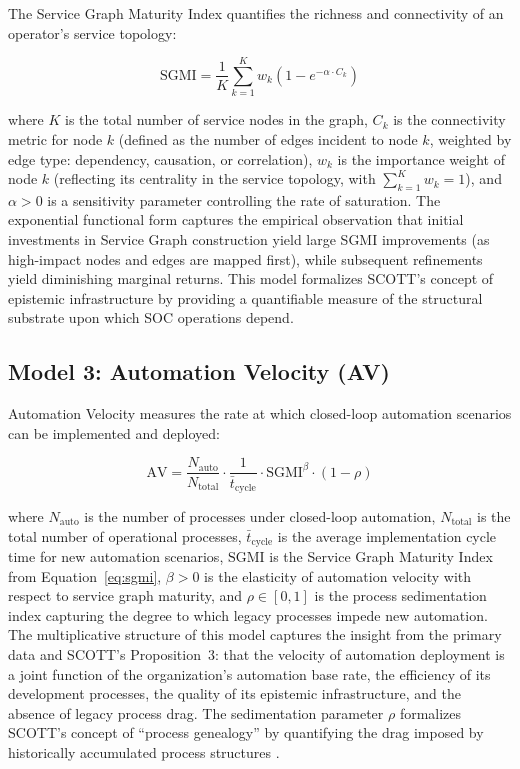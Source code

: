 \documentclass[12pt,a4paper]{article}
\begin{document}
The Service Graph Maturity Index quantifies the richness and connectivity of an operator's service topology:

\begin{equation}
\text{SGMI} = \frac{1}{K}\sum_{k=1}^{K} w_k \left(1 - e^{-\alpha \cdot C_k}\right)
\label{eq:sgmi}
\end{equation}

\noindent where $K$ is the total number of service nodes in the graph, $C_k$ is the connectivity metric for node $k$ (defined as the number of edges incident to node $k$, weighted by edge type: dependency, causation, or correlation), $w_k$ is the importance weight of node $k$ (reflecting its centrality in the service topology, with $\sum_{k=1}^{K} w_k = 1$), and $\alpha > 0$ is a sensitivity parameter controlling the rate of saturation. The exponential functional form captures the empirical observation that initial investments in Service Graph construction yield large SGMI improvements (as high-impact nodes and edges are mapped first), while subsequent refinements yield diminishing marginal returns. This model formalizes SCOTT's concept of epistemic infrastructure by providing a quantifiable measure of the structural substrate upon which SOC operations depend.

\subsection{Model 3: Automation Velocity (AV)}

Automation Velocity measures the rate at which closed-loop automation scenarios can be implemented and deployed:

\begin{equation}
\text{AV} = \frac{N_{\text{auto}}}{N_{\text{total}}} \cdot \frac{1}{\bar{t}_{\text{cycle}}} \cdot \text{SGMI}^{\beta} \cdot (1 - \rho)
\label{eq:av}
\end{equation}

\noindent where $N_{\text{auto}}$ is the number of processes under closed-loop automation, $N_{\text{total}}$ is the total number of operational processes, $\bar{t}_{\text{cycle}}$ is the average implementation cycle time for new automation scenarios, $\text{SGMI}$ is the Service Graph Maturity Index from Equation~\eqref{eq:sgmi}, $\beta > 0$ is the elasticity of automation velocity with respect to service graph maturity, and $\rho \in [0, 1]$ is the process sedimentation index capturing the degree to which legacy processes impede new automation. The multiplicative structure of this model captures the insight from the primary data and SCOTT's Proposition~3: that the velocity of automation deployment is a joint function of the organization's automation base rate, the efficiency of its development processes, the quality of its epistemic infrastructure, and the absence of legacy process drag. The sedimentation parameter $\rho$ formalizes SCOTT's concept of ``process genealogy'' by quantifying the drag imposed by historically accumulated process structures \citep{vandeven2007engaged}.
\end{document}
